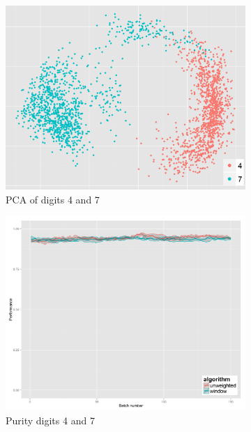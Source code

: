 \begin{figure}[H]
\begin{subfigure}{.3\textwidth}
  \centering
  \includegraphics[width=\linewidth]{PCA_pendigits_pairwise/pairwise_4_7_cropped.png}
  \caption{PCA of digits 4 and 7}
\end{subfigure}%
\begin{subfigure}{.3\textwidth}
  \centering
  \includegraphics[width=\linewidth]{pendigits_2_alg/uci_pendigits_47_ci_one_size_purity.png}
  \caption{Purity digits 4 and 7}
\end{subfigure}
\begin{subfigure}{.3\textwidth}
  \centering

\end{subfigure}
\end{figure}
